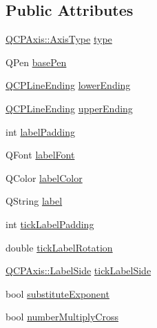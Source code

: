 \subsection*{Public Attributes}
\begin{DoxyCompactItemize}
\item 
\mbox{\hyperlink{class_q_c_p_axis_ae2bcc1728b382f10f064612b368bc18a}{Q\+C\+P\+Axis\+::\+Axis\+Type}} \mbox{\hyperlink{class_q_c_p_axis_painter_private_ae04594e97417336933d807c86d353098}{type}}
\item 
Q\+Pen \mbox{\hyperlink{class_q_c_p_axis_painter_private_ab4affb27ae3485fecb7466622cabcbb2}{base\+Pen}}
\item 
\mbox{\hyperlink{class_q_c_p_line_ending}{Q\+C\+P\+Line\+Ending}} \mbox{\hyperlink{class_q_c_p_axis_painter_private_a077696dd1e7efb96e4c199f521433e24}{lower\+Ending}}
\item 
\mbox{\hyperlink{class_q_c_p_line_ending}{Q\+C\+P\+Line\+Ending}} \mbox{\hyperlink{class_q_c_p_axis_painter_private_af764be913be5f924700ac9bbb8c01139}{upper\+Ending}}
\item 
int \mbox{\hyperlink{class_q_c_p_axis_painter_private_a3f7465372df132bf7814345ea697dd34}{label\+Padding}}
\item 
Q\+Font \mbox{\hyperlink{class_q_c_p_axis_painter_private_add1ff1030fbc36112c19b1468ad82d55}{label\+Font}}
\item 
Q\+Color \mbox{\hyperlink{class_q_c_p_axis_painter_private_a5c36467daf057da0cf0792f3c5a06089}{label\+Color}}
\item 
Q\+String \mbox{\hyperlink{class_q_c_p_axis_painter_private_afe004c322f92543c0467afc02da6cf6d}{label}}
\item 
int \mbox{\hyperlink{class_q_c_p_axis_painter_private_a264cfa080e84e536cf2d1ab9c5d5cc5f}{tick\+Label\+Padding}}
\item 
double \mbox{\hyperlink{class_q_c_p_axis_painter_private_ae6ade9232a8e400924009e8edca94bac}{tick\+Label\+Rotation}}
\item 
\mbox{\hyperlink{class_q_c_p_axis_a24b13374b9b8f75f47eed2ea78c37db9}{Q\+C\+P\+Axis\+::\+Label\+Side}} \mbox{\hyperlink{class_q_c_p_axis_painter_private_a9d27f7625fcfbeb3a60193d0c18fc7e9}{tick\+Label\+Side}}
\item 
bool \mbox{\hyperlink{class_q_c_p_axis_painter_private_a546d22b10ddb5ca8582b7deb90223a91}{substitute\+Exponent}}
\item 
bool \mbox{\hyperlink{class_q_c_p_axis_painter_private_a0deb7524009140f00a774dfd286d002c}{number\+Multiply\+Cross}}
\item 

\end{DoxyCompactItemize}
